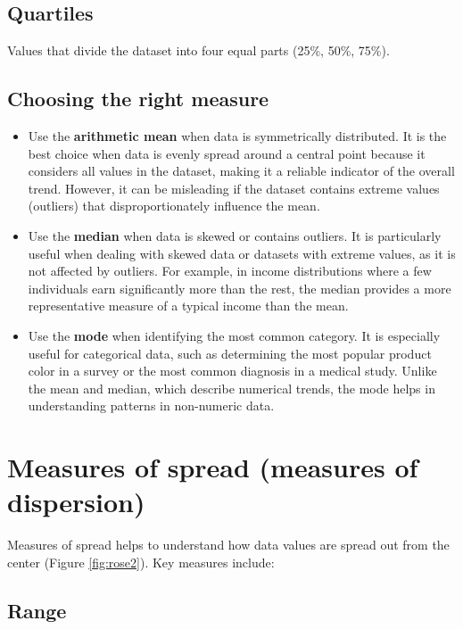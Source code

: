 \documentclass[
]{book}
\begin{document}
\subsection{Quartiles}\label{quartiles}

Values that divide the dataset into four equal parts (25\%, 50\%, 75\%).

\subsection{Choosing the right measure}\label{choosing-the-right-measure}

\begin{itemize}
\item
  Use the \textbf{arithmetic mean} when data is symmetrically distributed. It is the best choice when data is evenly spread around a central point because it considers all values in the dataset, making it a reliable indicator of the overall trend. However, it can be misleading if the dataset contains extreme values (outliers) that disproportionately influence the mean.
\item
  Use the \textbf{median} when data is skewed or contains outliers. It is particularly useful when dealing with skewed data or datasets with extreme values, as it is not affected by outliers. For example, in income distributions where a few individuals earn significantly more than the rest, the median provides a more representative measure of a typical income than the mean.
\item
  Use the \textbf{mode} when identifying the most common category. It is especially useful for categorical data, such as determining the most popular product color in a survey or the most common diagnosis in a medical study. Unlike the mean and median, which describe numerical trends, the mode helps in understanding patterns in non-numeric data.
\end{itemize}

\section{Measures of spread (measures of dispersion)}\label{spread}

Measures of spread helps to understand how data values are spread out from the center (Figure \ref{fig:rose2}). Key measures include:

\subsection{Range}\label{range}
\end{document}
